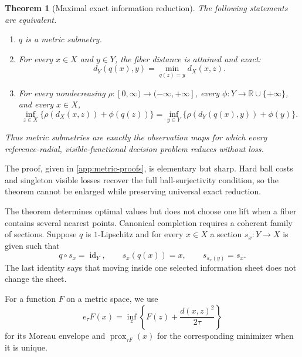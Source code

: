 \documentclass[10pt]{article}
\theoremstyle{plain}
\newtheorem{theorem}{Theorem}[section]
\theoremstyle{definition}
\theoremstyle{remark}
\newcommand{\R}{\mathbb R}
\newcommand{\prox}{\operatorname{prox}}
\begin{document}
\begin{theorem}[Maximal exact information reduction]
\label{thm:metric-characterization}
The following statements are equivalent.
\begin{enumerate}[label=(\Alph*),leftmargin=*]
  \item \(q\) is a metric submetry.
  \item For every \(x\in X\) and \(y\in Y\), the fiber distance is attained
  and exact:
  \begin{equation}
    d_Y(q(x),y)=\min_{q(z)=y}d_X(x,z).
    \label{eq:exact-fiber-distance}
  \end{equation}
  \item For every nondecreasing
  \(\rho:[0,\infty)\to(-\infty,+\infty]\), every
  \(\phi:Y\to\R\cup\{+\infty\}\), and every \(x\in X\),
  \begin{equation}
    \boxed{
    \inf_{z\in X}\{\rho(d_X(x,z))+\phi(q(z))\}
    =
    \inf_{y\in Y}\{\rho(d_Y(q(x),y))+\phi(y)\}.}
    \label{eq:universal-radial-reduction}
  \end{equation}
\end{enumerate}
Thus metric submetries are exactly the observation maps for which every
reference-radial, visible-functional decision problem reduces without loss.
\end{theorem}

The proof, given in \cref{app:metric-proofs}, is elementary but sharp.  Hard
ball costs and singleton visible losses recover the full ball-surjectivity
condition, so the theorem cannot be enlarged while preserving universal exact
reduction.

The theorem determines optimal values but does not choose one lift when a
fiber contains several nearest points.  Canonical completion requires a
coherent family of sections.  Suppose \(q\) is \(1\)-Lipschitz and for every
\(x\in X\) a section \(s_x:Y\to X\) is given such that
\begin{equation}
  q\circ s_x=\operatorname{id}_Y,
  \qquad
  s_x(q(x))=x,
  \qquad
  s_{s_x(y)}=s_x.
  \label{eq:coherent-sections}
\end{equation}
The last identity says that moving inside one selected information sheet does
not change the sheet.

For a function \(F\) on a metric space, we use
\[
  e_\tau F(x)=\inf_z\left\{F(z)+\frac{d(x,z)^2}{2\tau}\right\}
\]
for its Moreau envelope and \(\prox_{\tau F}(x)\) for the corresponding
minimizer when it is unique.
\end{document}
